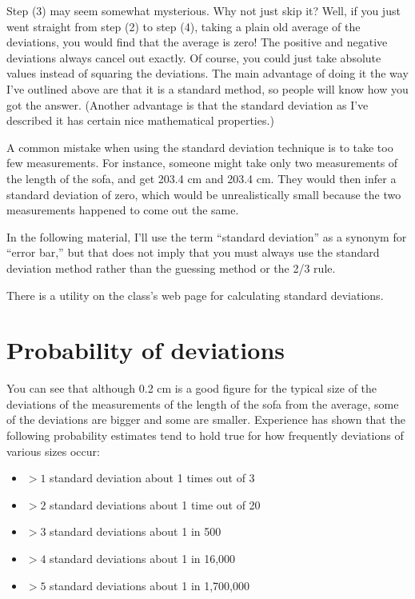 	Step (3) may seem somewhat mysterious. Why not just skip
it? Well, if you just went straight from step (2) to step
(4), taking a plain old average of the deviations, you would
find that the average is zero! The positive and negative
deviations always cancel out exactly. Of course, you could
just take absolute values instead of squaring the deviations.
The main advantage of doing it the way I've outlined above
are that it is a standard method, so people will know how
you got the answer. (Another advantage is that the standard
deviation as I've described it has certain nice mathematical properties.)

	A common mistake when using the standard deviation
technique is to take too few measurements. For instance,
someone might take only two measurements of the length of
the sofa, and get 203.4 cm and 203.4 cm. They would then
infer a standard deviation of zero, which would be
unrealistically small because the two measurements happened
to come out the same.

	In the following material, I'll use the term ``standard
deviation'' as a synonym for ``error bar,'' but that does
not imply that you must always use the standard deviation
method rather than the guessing method or the 2/3 rule.

There is a utility on the class's web page for calculating
standard deviations.

\section*{Probability of deviations}\label{probability-of-deviations}
	You can see that although 0.2 cm is a good figure for the
typical size of the deviations of the measurements of the
length of the sofa from the average, some of the deviations
are bigger and some are smaller. Experience has shown that
the following probability estimates tend to hold true for
how frequently deviations of various sizes occur:
\begin{itemize}
	\item[] $>1$ standard deviation	about 1 times out of 3

        \item[] $>2$ standard deviations	about 1 time out of 20

	\item[] $>3$ standard deviations	about 1 in 500

	\item[] $>4$ standard deviations	about 1 in 16,000

	\item[] $>5$ standard deviations about 1 in 1,700,000
\end{itemize}

